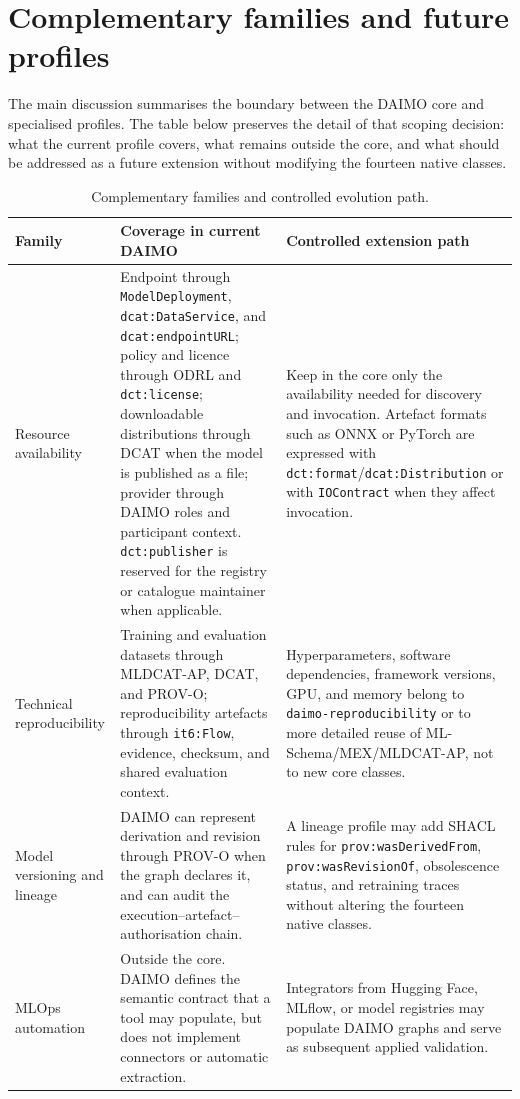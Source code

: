 \documentclass[Afour,sagev,times]{sagej}
\newcommand{\code}[1]{\texttt{#1}}
\begin{document}
\section{Complementary families and future profiles}\label{app:future-profiles}

The main discussion summarises the boundary between the DAIMO core and specialised profiles. The table below preserves the detail of that scoping decision: what the current profile covers, what remains outside the core, and what should be addressed as a future extension without modifying the fourteen native classes.

\begin{table}[tb]
\scriptsize\sf\centering
\caption{Complementary families and controlled evolution path.\label{tab:future-profiles}}
\begin{tabular}{@{}p{3.2cm}p{5.9cm}p{6.0cm}@{}}
\toprule
\textbf{Family} & \textbf{Coverage in current DAIMO} & \textbf{Controlled extension path} \\
\midrule
Resource availability & Endpoint through \code{ModelDeployment}, \code{dcat:DataService}, and \code{dcat:endpointURL}; policy and licence through ODRL and \code{dct:license}; downloadable distributions through DCAT when the model is published as a file; provider through DAIMO roles and participant context. \code{dct:publisher} is reserved for the registry or catalogue maintainer when applicable. & Keep in the core only the availability needed for discovery and invocation. Artefact formats such as ONNX or PyTorch are expressed with \code{dct:format}/\code{dcat:Distribution} or with \code{IOContract} when they affect invocation. \\
Technical reproducibility & Training and evaluation datasets through MLDCAT-AP, DCAT, and PROV-O; reproducibility artefacts through \code{it6:Flow}, evidence, checksum, and shared evaluation context. & Hyperparameters, software dependencies, framework versions, GPU, and memory belong to \code{daimo-reproducibility} or to more detailed reuse of ML-Schema/MEX/MLDCAT-AP, not to new core classes. \\
Model versioning and lineage & DAIMO can represent derivation and revision through PROV-O when the graph declares it, and can audit the execution--artefact--authorisation chain. & A lineage profile may add SHACL rules for \code{prov:wasDerivedFrom}, \code{prov:wasRevisionOf}, obsolescence status, and retraining traces without altering the fourteen native classes. \\
MLOps automation & Outside the core. DAIMO defines the semantic contract that a tool may populate, but does not implement connectors or automatic extraction. & Integrators from Hugging Face, MLflow, or model registries may populate DAIMO graphs and serve as subsequent applied validation. \\

\end{tabular}
\end{table}
\end{document}
